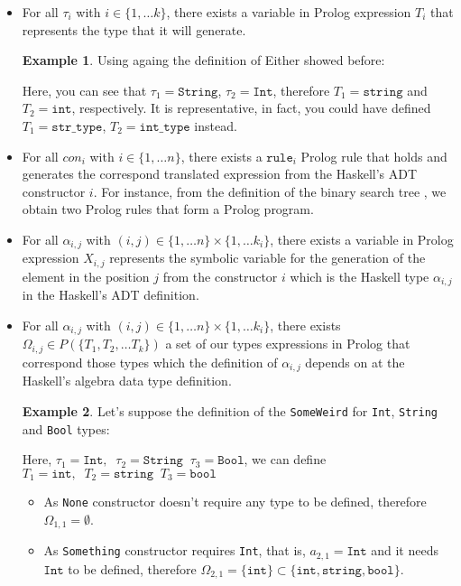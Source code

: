 \documentclass{report}
\theoremstyle{definition}
\newtheorem{example}{Example}[section]
\theoremstyle{definition}
\newcommand{\ttt}[1]{\texttt{#1}}
\newcommand{\tav}{\;\;}
\begin{document}
\begin{itemize}
	\item For all $\tau_i$ with $i \in \{1, \ldots k \}$, there exists a variable in Prolog expression $T_i$ that represents the type that it will generate.
	\begin{example}
		Using againg the definition of Either showed before:
		
		Here, you can see that $\tau_1 = \ttt{String}$, $\tau_2 = \ttt{Int}$, therefore $T_1 = \ttt{string}$ and $T_2 = \ttt{int}$, respectively. It is representative, in fact, you could have defined $T_1 = \ttt{str\_type}$, $T_2 = \ttt{int\_type}$ instead.
	\end{example}
	\item For all $con_i$ with $i \in \{1, \ldots n \}$, there exists a $\ttt{rule}_i$ Prolog rule that holds and generates the correspond translated expression from the Haskell's ADT constructor $i$. For instance, from the definition of the binary search tree , we obtain two Prolog rules that form a Prolog program.
	\item For all $\alpha_{i,j}$ with $(i,j) \in \{1, \ldots n \} \times \{1, \ldots k_i \}$, there exists a variable in Prolog expression $X_{i,j}$ represents the symbolic variable for the generation of the element in the position $j$ from the constructor $i$ which is the Haskell type $\alpha_{i,j}$ in the Haskell's ADT definition.
	\item For all $\alpha_{i,j}$ with $(i,j) \in \{1, \ldots n \} \times \{1, \ldots k_i \}$, there exists $\Omega_{i,j} \in P(\{ T_1 , T_2, \ldots T_k \}) $ a set of our types expressions in Prolog that correspond those types which the definition of $\alpha_{i,j}$ depends on at the Haskell's algebra data type definition.
	\begin{example}
		Let's suppose the definition of the \ttt{SomeWeird} for \ttt{Int}, \ttt{String} and \ttt{Bool} types:
		
		Here, $\tau_1 = \ttt{Int}, \tav \tau_2=\ttt{String} \tav \tau_3=\ttt{Bool}$, we can define $T_1 = \ttt{int}, \tav T_2=\ttt{string} \tav T_3=\ttt{bool}$
		\begin{itemize}
			\item As \ttt{None} constructor doesn't require any type to be defined, therefore $\Omega_{1,1} = \emptyset$.
			\item As \ttt{Something} constructor requires \ttt{Int}, that is, $a_{2,1} = \ttt{Int}$ and it needs $\ttt{Int}$ to be defined, therefore $\Omega_{2,1} = \{\ttt{int}\} \subset \{ \ttt{int}, \ttt{string}, \ttt{bool} \}$.

\end{itemize}
\end{example}
\end{itemize}
\end{document}
